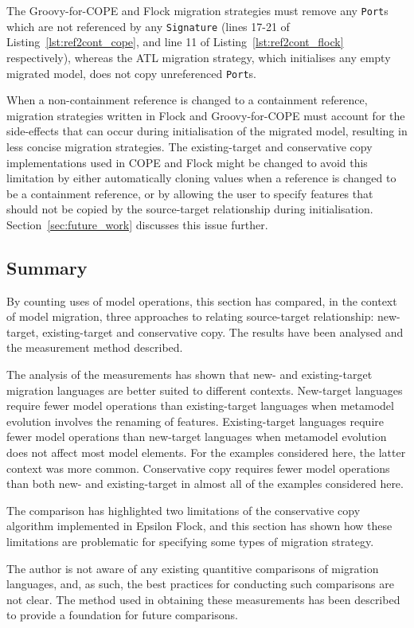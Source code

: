 The Groovy-for-COPE and Flock migration strategies must remove any \texttt{Port}s which are not referenced by any \texttt{Signature} (lines 17-21 of Listing~\ref{lst:ref2cont_cope}, and line 11 of Listing~\ref{lst:ref2cont_flock} respectively), whereas the ATL migration strategy, which initialises any empty migrated model, does not copy unreferenced \texttt{Port}s.

When a non-containment reference is changed to a containment reference, migration strategies written in Flock and Groovy-for-COPE must account for the side-effects that can occur during initialisation of the migrated model, resulting in less concise migration strategies. The existing-target and conservative copy implementations used in COPE and Flock might be changed to avoid this limitation by either automatically cloning values when a reference is changed to be a containment reference, or by allowing the user to specify features that should not be copied by the source-target relationship during initialisation. Section~\ref{sec:future_work} discusses this issue further. 

\subsection{Summary}
By counting uses of model operations, this section has compared, in the context of model migration, three approaches to relating source-target relationship: new-target, existing-target and conservative copy. The results have been analysed and the measurement method described.

The analysis of the measurements has shown that new- and existing-target migration languages are better suited to different contexts. New-target languages require fewer model operations than existing-target languages when metamodel evolution involves the renaming of features. Existing-target languages require fewer model operations than new-target languages when metamodel evolution does not affect most model elements. For the examples considered here, the latter context was more common. Conservative copy requires fewer model operations than both new- and existing-target in almost all of the examples considered here.

The comparison has highlighted two limitations of the conservative copy algorithm implemented in Epsilon Flock, and this section has shown how these limitations are problematic for specifying some types of migration strategy.

The author is not aware of any existing quantitive comparisons of migration languages, and, as such, the best practices for conducting such comparisons are not clear. The method used in obtaining these measurements has been described to provide a foundation for future comparisons. 
